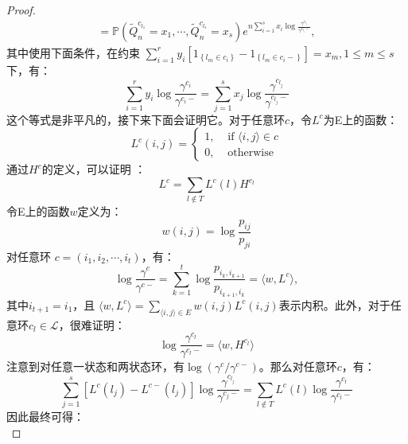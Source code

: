 \begin{proof}
\begin{equation*}
\begin{array}{l}
    =\mathbb{P}\left(\tilde{Q}_{n}^{c_{l_{1}}}=x_{1}, \cdots, \tilde{Q}_{n}^{c_{l_{s}}}=x_{s}\right) e^{n \sum_{i=1}^{s} x_{i} \log \frac{\gamma^{c_{l_i}}}{\gamma^{c_{l_i}-}}},
\end{array}
\end{equation*}
其中使用下面条件，在约束 $\sum_{i=1}^{r} y_{i}\left[1_{\left\{l_{m} \in c_{i}\right\}}-1_{\left\{l_{m} \in c_{i}-\right\}}\right]=x_{m}, 1 \leq m \leq s$下，有：
\begin{equation} \label{constraint}
    \sum_{i=1}^{r} y_{i} \log \frac{\gamma^{c_{i}}}{\gamma^{c_{i}-}}=\sum_{j=1}^{s} x_{j} \log \frac{\gamma^{c_{l_{j}}}}{\gamma^{c_{l_{j}}-}}
\end{equation}
这个等式是非平凡的，接下来下面会证明它。对于任意环$c$，令$L^c$为E上的函数：
\begin{equation*}
    L^{c}(i, j)= \begin{cases}1, & \text { if }\langle i, j\rangle \in c \\ 0, & \text { otherwise }\end{cases}
\end{equation*}
通过$H^c$的定义，可以证明 \cite{kalpazidou2007cycle}：
\begin{equation*}
    L^c = \sum_{l \notin T} L^c(l) H^{c_l}
\end{equation*}
令E上的函数$w$定义为：
\begin{equation*}
    w(i, j) = \log \frac{p_{ij}}{p_{ji}}
\end{equation*}
对任意环 $c=(i_1, i_2, \cdots, i_t)$，有：
\begin{equation*}
    \log \frac{\gamma^{c}}{\gamma^{c-}} = \sum^t_{k=1} \log \frac{p_{i_k, i_{k+1}}}{p_{i_{k+1}, i_k}} = \langle w, L^c \rangle,
\end{equation*}
其中$i_{t+1} = i_1$，且 $\langle w, L^c \rangle = \sum_{\langle i, j \rangle \in E} w(i,j) L^c(i,j)$表示内积。此外，对于任意环$c_l \in \mathcal{L}$，很难证明：
\begin{equation*}
    \log \frac{\gamma^{c_l}}{\gamma^{c_l -}} = \langle w, H^{c_l} \rangle
\end{equation*}
注意到对任意一状态和两状态环，有$\log (\gamma^c / \gamma^{c-})$。那么对任意环$c$，有：
\begin{equation*}
    \sum_{j=1}^{s}\left[L^{c}\left(l_{j}\right)-L^{c-}\left(l_{j}\right)\right] \log \frac{\gamma^{c_{l_{j}}}}{\gamma^{c_{j}-}}=\sum_{l \notin T} L^{c}(l) \log \frac{\gamma^{c_{l}}}{\gamma^{c_{l}-}}
\end{equation*}
因此最终可得：
\begin{equation*}

\end{equation*}
\end{proof}
